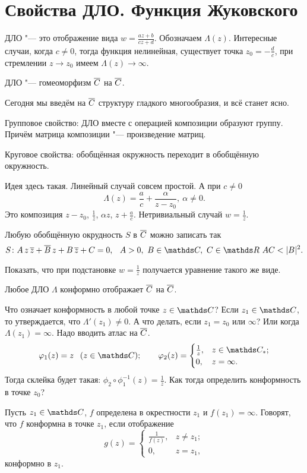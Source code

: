 \section{Свойства ДЛО. Функция Жуковского}
ДЛО "--- это отображение вида $w = \frac{az + b}{cz + d}$. Обозначаем $\Lambda(z)$. Интересные случаи, когда $c\ne 0$, тогда функция нелинейная, существует точка $z_0 = -\frac dc$, при стремлении $z\to z_0$ имеем $\Lambda(z)\to \infty$.
\begin{Ut}
	ДЛО "--- гомеоморфизм $\overline{C}$ на $\overline{C}$.
\end{Ut}
Сегодня мы введём на $\overline{C}$ структуру гладкого многообразия, и всё станет ясно.
\begin{Ut}
	Групповое свойство: ДЛО вместе с операцией композиции образуют группу. Причём матрица композиции "--- произведение матриц.
\end{Ut}
\begin{Ut}
	Круговое свойства: обобщённая окружность переходит в обобщённую окружность.
\end{Ut}
\begin{Proof}
	Идея здесь такая. Линейный случай совсем простой. А при $c\ne 0$
	\[\Lambda(z) = \frac ac + \frac{\alpha}{z-z_0},\ \alpha\ne0.\]
	Это композиция $z-z_0$, $\frac1z$, $\alpha z$, $z + \frac ac$. Нетривиальный случай $w = \frac1z$.
\end{Proof}
\begin{Task}
	Любую обобщённую окрудность $S$ в $\overline{C}$ можно записать так
	\[S\colon A\,z\,\ol z + \ol B\, z+ B\,\ol z + C = 0,\pau A>0,\ B\in\C,\ C\in \R\ AC<|B|^2.\]

	Показать, что при подстановке $w = \frac1z$ получается уравнение такого же виде.
\end{Task}
\begin{Ut}
	Любое ДЛО $\Lambda$ конформно отображает $\overline{C}$ на $\overline{C}$.
\end{Ut}
Что означает конформность в любой точке $z\in\C$? Если $z_1\in\C$, то утверждается, что $\Lambda'(z_1)\ne 0$. А что делать, если $z_1=z_0$ или $\infty$? Или когда $\Lambda(z_1)=\infty$. Надо вводить атлас на $\overline{C}$.
\[
	\phi_1(z) = z\pau (z\in\C);\qquad\phi_2(z) = \begin{cases}
		\frac1z,&z\in\C_*;\\ 0,& z=\infty.
	\end{cases}
\]
Тогда склейка будет такая: $\phi_2\circ\phi_1^{-1}(z) = \frac1z$. Как тогда определить конформность в точке $z_0$?
\begin{Def}
	Пусть $z_1\in\C$, $f$ определена в окрестности $z_1$ и $f(z_1) = \infty$. Говорят, что $f$ конформна в точке $z_1$, если отображение
	\[
		g(z) = \begin{cases}
			\frac1{f(z)},&z\ne z_1;\\ 0,&z = z_1,
		\end{cases}
	\]
	конформно в $z_1$.
\end{Def}
